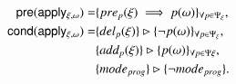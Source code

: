 \begin{itemize}
\begin{enumerate}
\begin{small}
\begin{align*}
\hspace*{7pt}\mathsf{pre}(\mathsf{apply_{\xi,\omega}})=&\{pre_{p}(\xi)\implies p(\omega)\}_{\forall p\in\Psi_\xi},\\
\mathsf{cond}(\mathsf{apply_{\xi,\omega}})=&\{del_{p}(\xi)\}\rhd\{\neg p(\omega)\}_{\forall p\in\Psi_\xi},\\
&\{add_{p}(\xi)\}\rhd\{p(\omega)\}_{\forall p\in\Psi\xi},\\
&\{mode_{prog}\}\rhd\{\neg mode_{prog}\}.
\end{align*}
\end{small}




\end{enumerate}
\end{itemize}
